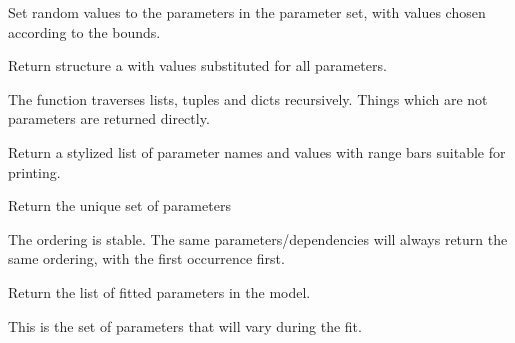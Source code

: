 \documentclass[letterpaper,10pt,english]{sphinxmanual}
\begin{document}

\begin{fulllineitems}
\label{api/mystic.parameter:refl1d.mystic.parameter.randomize}
Set random values to the parameters in the parameter set, with
values chosen according to the bounds.

\end{fulllineitems}


\begin{fulllineitems}
\label{api/mystic.parameter:refl1d.mystic.parameter.substitute}
Return structure a with values substituted for all parameters.

The function traverses lists, tuples and dicts recursively.  Things
which are not parameters are returned directly.

\end{fulllineitems}


\begin{fulllineitems}
\label{api/mystic.parameter:refl1d.mystic.parameter.summarize}
Return a stylized list of parameter names and values with range bars
suitable for printing.

\end{fulllineitems}


\begin{fulllineitems}
\label{api/mystic.parameter:refl1d.mystic.parameter.unique}
Return the unique set of parameters

The ordering is stable.  The same parameters/dependencies will always
return the same ordering, with the first occurrence first.

\end{fulllineitems}


\begin{fulllineitems}
\label{api/mystic.parameter:refl1d.mystic.parameter.varying}
Return the list of fitted parameters in the model.

This is the set of parameters that will vary during the fit.

\end{fulllineitems}
\end{document}
